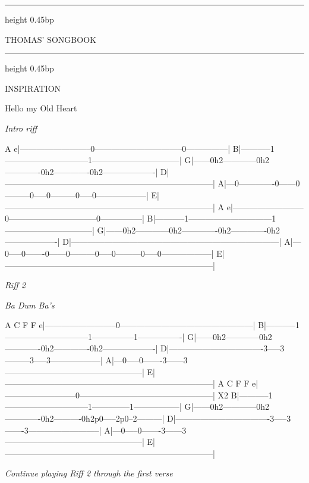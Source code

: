 \documentclass[10pt,twoside]{article}
\makeatletter
\newlength{\songcolumnwidth}
\newcommand{\songbooktitle}{Thomas' Songbook}
\newcommand{\categorylabel}[1]{%
  {\categoryface\fontsize{17bp}{19bp}\selectfont\MakeUppercase{#1}}%
}
\newcommand{\category}[1]{%
  \par\noindent
  \parbox[c]{\songcolumnwidth}{%
    \centering
    \hrule height 0.45bp\vskip 2.5bp
    {\mastheadface\fontsize{10bp}{11bp}\selectfont\MakeUppercase{\songbooktitle}\par}%
    \vskip 2bp\hrule height 0.45bp
  }%
  \hfill
  \categorylabel{#1}%
  \par\vspace{11bp}%
}
\newcommand{\songtext}{\raggedright\fontsize{9bp}{9.15bp}\selectfont}
\newcommand{\songtitle}[1]{%
  \par\addvspace{9bp}%
  {\titleface\fontsize{14.5bp}{15bp}\selectfont #1\par}%
  \nobreak\vskip 2bp%
}
\newcommand{\chordsuffix}[1]{%
  \raisebox{-.16em}{\fontsize{\dimexpr\f@size pt * 7 / 10\relax}{\baselineskip}\selectfont #1}%
}
\newcommand{\playnote}[1]{%
  \par\addvspace{4bp}%
  {\sffamily\itshape\fontsize{7bp}{8bp}\selectfont #1\par}%
  \nobreak
}
\newcommand{\tabchordsuffix}[1]{\rlap{\chordsuffix{#1}}\phantom{#1}}
\makeatother
\begin{document}
\clearpage

\category{Inspiration}

\begingroup
\songtext
\songtitle{Hello my Old Heart}
\playnote{Intro riff}
\begin{songtab}[fontsize=\fontsize{7.5bp}{8.25bp}\selectfont]
   A\tabchordsuffix{m}
e|--------------------------0--------------------------------0---------------|
B|-----------1------------------------------1--------------------------------|
G|------0h2------------0h2-------------0h2-------------0h2-------------------|
D|---------------------------------------------------------------------------|
A|---0-------------0------0---------0-----0---------0-----0------------------|
E|---------------------------------------------------------------------------|
   A\tabchordsuffix{m}
e|--------------------------0--------------------------------0---------------|
B|-----------1------------------------------1--------------------------------|
G|------0h2------------0h2-------------0h2-------------0h2-------------------|
D|---------------------------------------------------------------------------|
A|---0-----0-------0------0---------0-----0---------0-----0------------------|
E|---------------------------------------------------------------------------|
\end{songtab}
\playnote{Riff 2}
\playnote{Ba Dum Ba's}
\begin{songtab}[fontsize=\fontsize{7.5bp}{8.25bp}\selectfont]
     A\tabchordsuffix{m}            C                F               F
e|--------------------------0------------------------------------------------|
B|-----------1------------------------------1---------------1----------------|
G|------0h2------------0h2-------------0h2-------------0h2-------------------|
D|----------------------------------3-----3---------3-----3------------------|
A|---0-----0-------3------3--------------------------------------------------|
E|---------------------------------------------------------------------------|
     A\tabchordsuffix{m}             C               F               F
e|--------------------------0------------------------------------------------| X2
B|-----------1------------------------------1--------------1-----------------|
G|------0h2------------0h2-------------0h2----------0h2p0-----2p0--2---------|
D|----------------------------------3-----3-------3--------------------------|
A|---0-----0-------3------3--------------------------------------------------|
E|---------------------------------------------------------------------------|
\end{songtab}
\playnote{Continue playing Riff 2 through the first verse}
\endgroup
\end{document}
